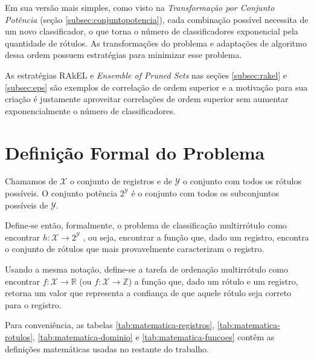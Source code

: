 \documentclass[runningheads,a4paper]{llncs}
\begin{document}
Em sua versão mais simples, como visto na \textit{Transformação por Conjunto Potência} (seção \ref{subsec:conjuntopotencia}), cada combinação possível necessita de um novo classificador, o que torna o número de classificadores exponencial pela quantidade de rótulos. As transformações do problema e adaptações de algoritmo dessa ordem possuem estratégias para minimizar esse problema.

As estratégias RAkEL e \textit{Ensemble of Pruned Sets} nas seções \ref{subsec:rakel} e \ref{subsec:eps} são exemplos de correlação de ordem superior e a motivação para sua criação é justamente aproveitar correlações de ordem superior sem aumentar exponencialmente o número de classificadores.

\section{Definição Formal do Problema} \label{sec:formal}

Chamamos de $\mathcal{X}$ o conjunto de registros e de $\mathcal{Y}$ o conjunto com todos os rótulos possíveis. O conjunto potência $2^{\mathcal{Y}}$ é o conjunto com todos os subconjuntos possíveis de $\mathcal{Y}$.

Define-se então, formalmente, o problema de classificação multirrótulo como encontrar $h : \mathcal{X} \to 2^\mathcal{Y}$ , ou seja, encontrar a função que, dado um registro, encontra o conjunto de rótulos que mais provavelmente caracterizam o registro.

Usando a mesma notação, define-se a tarefa de ordenação multirrótulo como encontrar $f : \mathcal{X} \to \mathbb{R}$ (ou $f : \mathcal{X} \to \mathbb{Z}$) a função que, dado um rótulo e um registro, retorna um valor que representa a confiança de que aquele rótulo seja correto para o registro.

Para conveniência, as tabelas \ref{tab:matematica-registros}, \ref{tab:matematica-rotulos}, \ref{tab:matematica-dominio} e \ref{tab:matematica-funcoes} contêm as definições matemáticas usadas no restante do trabalho.
\end{document}

